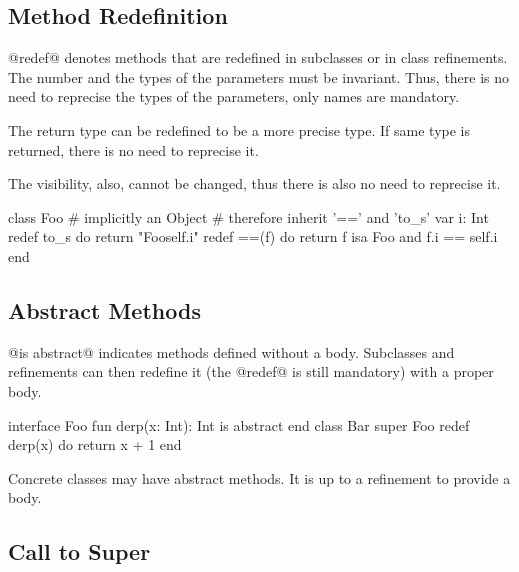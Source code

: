 \subsection{Method Redefinition}\label{redef}

@redef@ denotes methods that are redefined in subclasses or in class refinements.
The number and the types of the parameters must be invariant.
Thus, there is no need to reprecise the types of the parameters, only names are mandatory.

The return type can be redefined to be a more precise type.
If same type is returned, there is no need to reprecise it.

The visibility, also, cannot be changed, thus there is also no need to reprecise it.

\begin{lst}
class Foo
	# implicitly an Object
	# therefore inherit '==' and 'to_s' 
	var i: Int
	redef to_s do return "Foo{self.i}"
	redef ==(f) do return f isa Foo and f.i == self.i
end
\end{lst}

\subsection{Abstract Methods}\label{abstract}

@is abstract@ indicates methods defined without a body.
Subclasses and refinements can then redefine it (the @redef@ is still mandatory) with a proper body.

\begin{lst}
interface Foo
	fun derp(x: Int): Int is abstract
end
class Bar
	super Foo
	redef derp(x) do return x + 1
end
\end{lst}

Concrete classes may have abstract methods.
It is up to a refinement to provide a body.

\subsection{Call to Super}\label{super}

